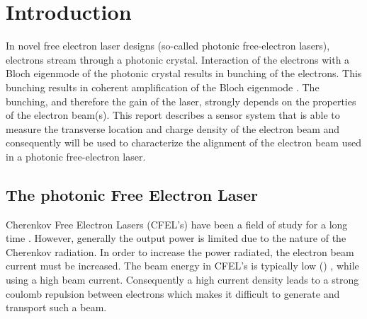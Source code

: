 \chapter{Introduction}
\label{sec:introduction}
% 
In novel free electron laser designs (so-called photonic free-electron lasers), electrons stream through a photonic crystal. Interaction of the electrons with a Bloch eigenmode of the photonic crystal results in bunching of the electrons. This bunching results in coherent amplification of the Bloch eigenmode \cite{Denis}.
The bunching, and therefore the gain of the laser, strongly depends on the properties of the electron beam(s).
This report describes a sensor system that is able to measure the transverse location and charge density of the electron beam and consequently will be used to characterize the alignment of the electron beam used in a photonic free-electron laser.
%

\section{The photonic Free Electron Laser}
Cherenkov Free Electron Lasers (CFEL's) have been a field of study for a long time . However, generally the output power is limited due to the nature of the Cherenkov radiation.
In order to increase the power radiated, the electron beam current must be increased. The beam energy in CFEL's is typically low () , while using a high beam current. Consequently a high current density leads to a strong coulomb repulsion between electrons which makes it difficult to generate and transport such a beam.


